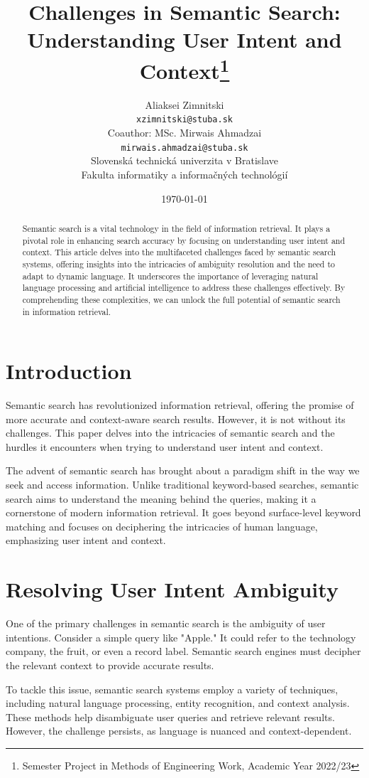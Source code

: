 \documentclass[10pt,oneside,a4paper]{article}
\title{Challenges in Semantic Search: Understanding User Intent and Context\thanks{Semester Project in Methods of Engineering Work, Academic Year 2022/23}}
\author{Aliaksei Zimnitski \\[2pt]
{\small \texttt{xzimnitski@stuba.sk}}\\
Coauthor: MSc. Mirwais Ahmadzai \\[2pt]
{\small \texttt{mirwais.ahmadzai@stuba.sk}}\\
{\small Slovenská technická univerzita v Bratislave}\\
{\small Fakulta informatiky a informačných technológií}\\
}
\date{\small \today}
\begin{document}
\maketitle

\begin{abstract}
Semantic search is a vital technology in the field of information retrieval. It plays a pivotal role in enhancing search accuracy by focusing on understanding user intent and context. This article delves into the multifaceted challenges faced by semantic search systems, offering insights into the intricacies of ambiguity resolution and the need to adapt to dynamic language. It underscores the importance of leveraging natural language processing and artificial intelligence to address these challenges effectively. By comprehending these complexities, we can unlock the full potential of semantic search in information retrieval.
\end{abstract}


\section{Introduction}
Semantic search has revolutionized information retrieval, offering the promise of more accurate and context-aware search results. However, it is not without its challenges. This paper delves into the intricacies of semantic search and the hurdles it encounters when trying to understand user intent and context.

The advent of semantic search has brought about a paradigm shift in the way we seek and access information. Unlike traditional keyword-based searches, semantic search aims to understand the meaning behind the queries, making it a cornerstone of modern information retrieval. It goes beyond surface-level keyword matching and focuses on deciphering the intricacies of human language, emphasizing user intent and context.

\section{Resolving User Intent Ambiguity}
One of the primary challenges in semantic search is the ambiguity of user intentions. Consider a simple query like "Apple." It could refer to the technology company, the fruit, or even a record label. Semantic search engines must decipher the relevant context to provide accurate results.

To tackle this issue, semantic search systems employ a variety of techniques, including natural language processing, entity recognition, and context analysis. These methods help disambiguate user queries and retrieve relevant results. However, the challenge persists, as language is nuanced and context-dependent.
\end{document}
